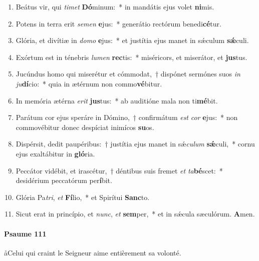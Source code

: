\documentclass[twoside]{article}
\begin{document}
\begin{paracol}[1]{2}
\begin{enumerate}[wide, itemsep=0mm, labelwidth=!, labelindent=0pt, label=\color{gregoriocolor}\theenumi]
\item Beátus vir, qui \textit{ti}\textit{met} \textbf{Dó}minum:~* in mandátis ejus volet \textbf{ni}mis.
\item Potens in terra erit \textit{se}\textit{men} \textbf{e}jus:~* generátio rectórum benedi\textbf{cé}tur.
\item Glória, et divítiæ in \textit{do}\textit{mo} \textbf{e}jus:~* et justítia ejus manet in sǽculum \textbf{sǽ}culi.
\item Exórtum est in ténebris \textit{lu}\textit{men} \textbf{rec}tis:~* miséricors, et miserátor, et \textbf{jus}tus.
\item Jucúndus homo qui miserétur et cómmodat,~† dispónet sermónes suos \textit{in} \textit{ju}\textbf{dí}cio:~* quia in ætérnum non commo\textbf{vé}bitur.
\item In memória ætérna \textit{e}\textit{rit} \textbf{jus}tus:~* ab auditióne mala non ti\textbf{mé}bit.
\item Parátum cor ejus speráre in Dómino,~† confirmátum \textit{est} \textit{cor} \textbf{e}jus:~* non commovébitur donec despíciat inimícos \textbf{su}os.
\item Dispérsit, dedit paupéribus:~† justítia ejus manet in sǽ\textit{cu}\textit{lum} \textbf{sǽ}culi,~* cornu ejus exaltábitur in \textbf{gló}ria.
\item Peccátor vidébit, et irascétur,~† déntibus suis fremet \textit{et} \textit{ta}\textbf{bé}scet:~* desidérium peccatórum per\textbf{í}bit.
\item Glória Pa\textit{tri}, \textit{et} \textbf{Fí}lio,~* et Spirítui \textbf{Sanc}to.
\item Sicut erat in princípio, et \textit{nunc}, \textit{et} \textbf{sem}per,~* et in sǽcula sæculórum. \textbf{A}men.
\end{enumerate}

\switchcolumn

\paragraph{Psaume 111}

\aa Celui qui craint le Seigneur aime entièrement sa volonté.



\end{paracol}
\end{document}
